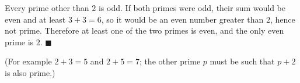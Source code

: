 Every prime other than $2$ is odd. If both primes were odd, their sum would be even and at least $3+3=6$, so it would be an even number greater than $2$, hence not prime. Therefore at least one of the two primes is even, and the only even prime is $2$. $\blacksquare$

(For example $2+3=5$ and $2+5=7$; the other prime $p$ must be such that $p+2$ is also prime.)
